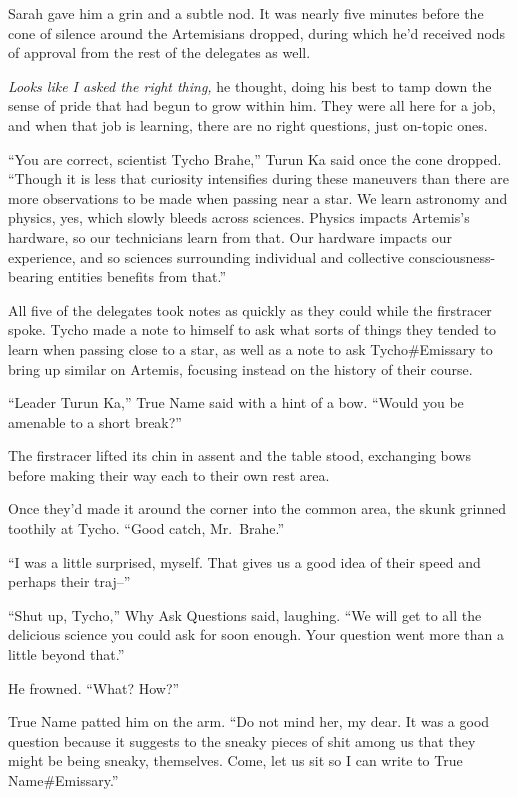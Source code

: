 Sarah gave him a grin and a subtle nod. It was nearly five minutes before the cone of silence around the Artemisians dropped, during which he'd received nods of approval from the rest of the delegates as well.

\emph{Looks like I asked the right thing,} he thought, doing his best to tamp down the sense of pride that had begun to grow within him. They were all here for a job, and when that job is learning, there are no right questions, just on-topic ones.

``You are correct, scientist Tycho Brahe,'' Turun Ka said once the cone dropped. ``Though it is less that curiosity intensifies during these maneuvers than there are more observations to be made when passing near a star. We learn astronomy and physics, yes, which slowly bleeds across sciences. Physics impacts Artemis's hardware, so our technicians learn from that. Our hardware impacts our experience, and so sciences surrounding individual and collective consciousness-bearing entities benefits from that.''

All five of the delegates took notes as quickly as they could while the firstracer spoke. Tycho made a note to himself to ask what sorts of things they tended to learn when passing close to a star, as well as a note to ask Tycho\#Emissary to bring up similar on Artemis, focusing instead on the history of their course.

``Leader Turun Ka,'' True Name said with a hint of a bow. ``Would you be amenable to a short break?''

The firstracer lifted its chin in assent and the table stood, exchanging bows before making their way each to their own rest area.

Once they'd made it around the corner into the common area, the skunk grinned toothily at Tycho. ``Good catch, Mr.~Brahe.''

``I was a little surprised, myself. That gives us a good idea of their speed and perhaps their traj--''

``Shut up, Tycho,'' Why Ask Questions said, laughing. ``We will get to all the delicious science you could ask for soon enough. Your question went more than a little beyond that.''

He frowned. ``What? How?''

True Name patted him on the arm. ``Do not mind her, my dear. It was a good question because it suggests to the sneaky pieces of shit among us that they might be being sneaky, themselves. Come, let us sit so I can write to True Name\#Emissary.''

